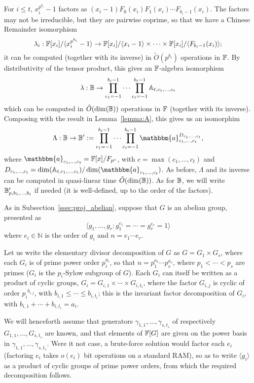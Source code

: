For $i \le t$, $x_i^{p^{b_i}}-1$ factors as $(x_i-1) F_0(x_i)
F_1(x_i) \cdots F_{b_i-1}(x_i)$. The factors may not be irreducible,
but they are pairwise coprime, so that we have a Chinese Remainder
isomorphism
$$\lambda_i: \mathbb{F}[x_i]/\langle x_i^{p^{b_i}}-1 \rangle \to \mathbb{F}[x_i]/\langle x_i-1\rangle
\times \cdots \times  \mathbb{F}[x_i]/\langle F_{b_i-1}(x_i)\rangle;$$
it can be computed (together with its inverse) 
in $\tilde{O}(p^{b_i})$ operations in $\mathbb{F}$. By distributivity of the tensor
product, 
this gives an $\mathbb{F}$-algebra isomorphism
$$\lambda: \mathbb{B} \to \prod_{c_1=-1}^{b_i-1} \cdots \prod_{c_t=-1}^{b_t-1} \mathbb{A}_{t,c_1,\dots,c_t}$$
which can be computed in $\tilde{O}(\dim(\mathbb{B}))$ operations in $\mathbb{F}$ (together with its inverse).
Composing with the result in Lemma~\ref{lemma:A}, this gives
us an isomorphim
$$\Lambda: \B \to \B':=\prod_{c_1=-1}^{b_i-1} \cdots \prod_{c_t=-1}^{b_t-1}
\mathbbm{a}_{c_1,\dots,c_t}^{D_{c_1,\dots,c_t}},$$ where
$\mathbbm{a}_{c_1,\dots,c_t} = \F[x]/F_{p^c}$, with $c
=\max(c_1,\dots,c_t)$ and $D_{c_1,\dots,c_t} =
\dim(\A_{t,c_1,\dots,c_t})/\dim(\mathbbm{a}_{c_1,\dots,c_t})$.  As
before, $\Lambda$ and its inverse can be computed in quasi-linear time
$\tilde{O}(\dim(\mathbb{B}))$. As for $\mathbb{B}$, we will 
write $\mathbb{B}'_{p,b_1,\dots,b_t}$ if needed (it is well-defined, up to the order of the factors).

  As in Subsection~\ref{ssec:proj_abelian}, suppose
that $G$ is an abelian group, presented as
$$ \langle g_1, \ldots , g_r: g_{1}^{e_1} = \cdots = g_{r}^{e_r} = 1
\rangle$$ where $ e_i \in \mathbb{N}$ is the order of $g_i$ and $n =
e_1 \cdots e_r$. 

Let us write the elementary divisor decomposition of $G$ as $G = G_1
\times G_s$, where each $G_i$ is of prime power order $p_i^{a_i}$, so
that $n = p_1^{a_1} \cdots p_s^{a_s}$, where $p_1 < \cdots < p_s$ are
primes ($G_i$ is the $p_i$-Sylow subgroup of $G$). Each $G_i$ can
itself be written as a product of cyclic groups, $G_i = G_{i,1} \times
\cdots \times G_{i,t_i}$, where the factor $G_{i,j}$ is cyclic of
order ${p_i}^{b_{i,j}}$, with $b_{i,1} \le \cdots \le b_{i,t_i}$; this
is the invariant factor decomposition of $G_i$, with $b_{i,1} + \cdots
+ b_{i,t_i} = a_i$.

We will henceforth assume that generators
$\gamma_{1,1},\dots,\gamma_{s,t_s}$ of respectively
$G_{1,1},\dots,G_{s,t_s}$ are known, and that elements of $\mathbb{F}[G]$ are
given on the power basis in $\gamma_{1,1},\dots,\gamma_{s,t_s}$. Were
it not case, a brute-force solution would factor each $e_i$ (factoring
$e_i$ takes $o(e_i)$ bit operations on a standard RAM), so as to write
$\langle g_i \rangle$ as a product of cyclic groups of prime power
orders, from which the required decomposition follows.

